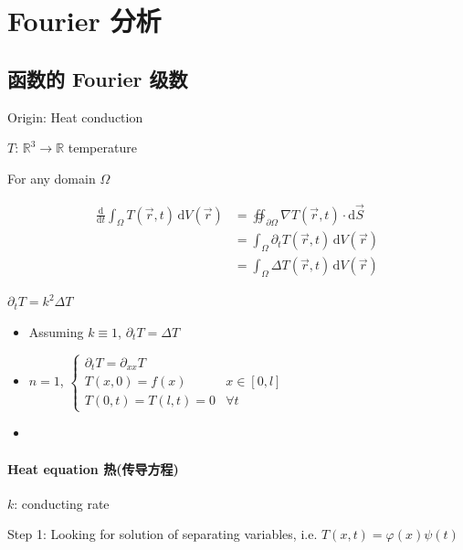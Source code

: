 \section{Fourier 分析}

\subsection{函数的 Fourier 级数}

Origin: Heat conduction

$T$: $\mathbb{R}^3\to\mathbb{R}$ temperature

For any domain $\Omega$

\begin{align*}
    \frac{\mathrm{d}}{\mathrm{d}t}\int_\Omega T\left(\overrightarrow{r},t\right)\,\mathrm{d}V\left(\overrightarrow{r}\right)
     & =\oiint_{\partial\Omega}\nabla T\left(\overrightarrow{r},t\right)\cdot\mathrm{d}\overrightarrow{S}      \\
     & =\int_{\Omega}\partial_t T\left(\overrightarrow{r},t\right)\,\mathrm{d}V\left(\overrightarrow{r}\right) \\
     & =\int_\Omega\Delta T\left(\overrightarrow{r},t\right)\,\mathrm{d}V\left(\overrightarrow{r}\right)
\end{align*}

$\partial_t T=k^2\Delta T$

\begin{itemize}
    \item Assuming $k\equiv 1$, $\partial_t T=\Delta T$
    \item $n=1$, $\begin{cases}
                  \partial_t T=\partial_{xx}T \\
                  T(x,0)=f(x)     & x\in[0,l] \\
                  T(0,t)=T(l,t)=0 & \forall t
              \end{cases}$
    \item \allbold{boundary value problem on $[0,l]\times[0,+\infty)$}
\end{itemize}

\paragraph*{Heat equation 热(传导方程)}

$k$: conducting rate

Step 1: Looking for solution of separating variables, i.e. $T(x,t)=\varphi(x)\psi(t)$

